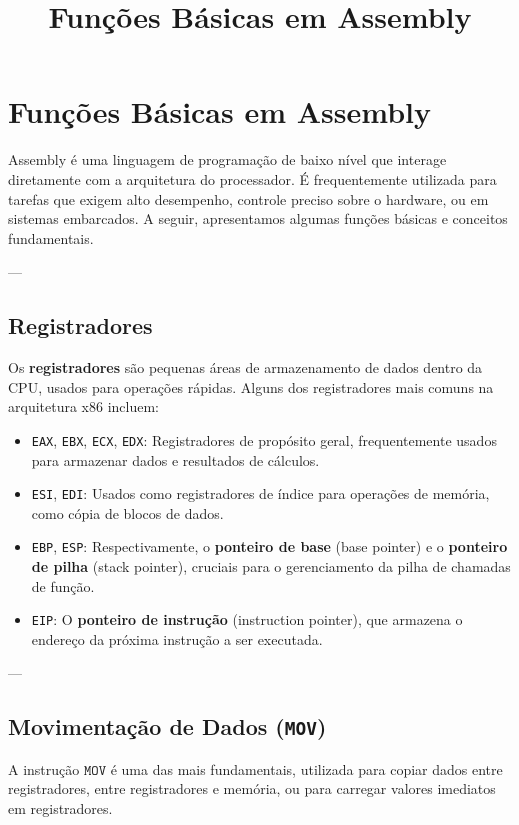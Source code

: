 \documentclass{article}
\title{Funções Básicas em Assembly}
\author{} %
\date{} %
\begin{document}
\maketitle

\section{Funções Básicas em Assembly}

Assembly é uma linguagem de programação de baixo nível que interage diretamente com a arquitetura do processador. É frequentemente utilizada para tarefas que exigem alto desempenho, controle preciso sobre o hardware, ou em sistemas embarcados. A seguir, apresentamos algumas funções básicas e conceitos fundamentais.

---

\subsection{Registradores}

Os \textbf{registradores} são pequenas áreas de armazenamento de dados dentro da CPU, usados para operações rápidas. Alguns dos registradores mais comuns na arquitetura x86 incluem:

\begin{itemize}
    \item \texttt{EAX}, \texttt{EBX}, \texttt{ECX}, \texttt{EDX}: Registradores de propósito geral, frequentemente usados para armazenar dados e resultados de cálculos.
    \item \texttt{ESI}, \texttt{EDI}: Usados como registradores de índice para operações de memória, como cópia de blocos de dados.
    \item \texttt{EBP}, \texttt{ESP}: Respectivamente, o \textbf{ponteiro de base} (base pointer) e o \textbf{ponteiro de pilha} (stack pointer), cruciais para o gerenciamento da pilha de chamadas de função.
    \item \texttt{EIP}: O \textbf{ponteiro de instrução} (instruction pointer), que armazena o endereço da próxima instrução a ser executada.
\end{itemize}

---

\subsection{Movimentação de Dados (\texttt{MOV})}

A instrução $\texttt{MOV}$ é uma das mais fundamentais, utilizada para copiar dados entre registradores, entre registradores e memória, ou para carregar valores imediatos em registradores.
\end{document}
